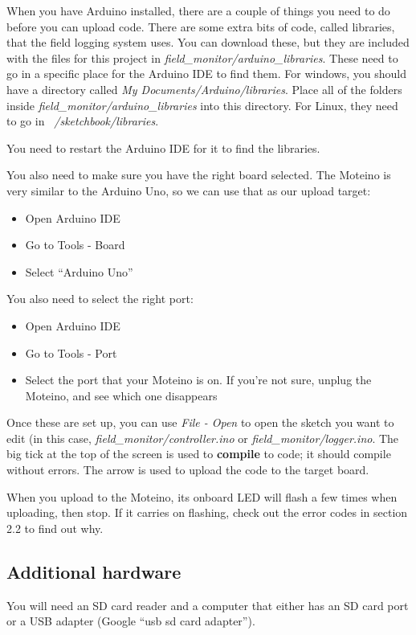 \documentclass[10pt]{article}
\begin{document}
When you have Arduino installed, there are a couple of things you need to do before you can upload code. There are some extra bits of code, called libraries, that the
field logging system uses. You can download these, but they are included with the files for this project in \textit{field\_monitor/arduino\_libraries}. These need to
go in a specific place for the Arduino IDE to find them. For windows, you should have a directory called \textit{My Documents/Arduino/libraries}. Place all of the folders
inside \textit{field\_monitor/arduino\_libraries} into this directory. For Linux, they need to go in \textit{~/sketchbook/libraries}. 

You need to restart the Arduino IDE for it to find the libraries.

You also need to make sure you have the right board selected. The Moteino is very similar to the Arduino Uno, so we can use that as our upload target:

\begin{itemize}
 \item Open Arduino IDE 
 \item Go to Tools - Board
 \item Select ``Arduino Uno''
\end{itemize}

You also need to select the right port:

\begin{itemize}
 \item Open Arduino IDE 
 \item Go to Tools - Port
 \item Select the port that your Moteino is on. If you're not sure, unplug the Moteino, and see which one disappears
\end{itemize}

Once these are set up, you can use \textit{File - Open} to open the sketch you want to edit (in this case, \textit{field\_monitor/controller.ino} or \textit{field\_monitor/logger.ino}. The big tick at the top of the screen is used to \textbf{compile} to code; it should compile without errors. The arrow is used to upload the code to the target board.

When you upload to the Moteino, its onboard LED will flash a few times when uploading, then stop. If it carries on flashing, check out the error codes in section 2.2 to find out why.

\subsection{Additional hardware}
You will need an SD card reader and a computer that either has an SD card port or a USB adapter (Google ``usb sd card adapter'').
\end{document}
